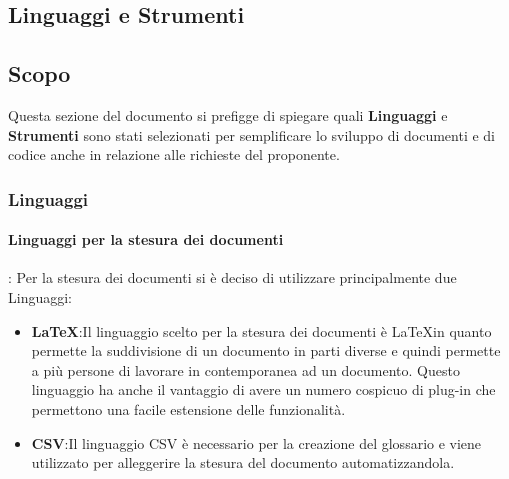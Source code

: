 \subsection{Linguaggi e Strumenti}
\subsection{Scopo}
Questa sezione del documento si prefigge di spiegare quali \textbf{Linguaggi} e
\textbf{Strumenti} sono stati selezionati per semplificare lo sviluppo di documenti
e di codice anche in relazione alle richieste del proponente.
\subsubsection{Linguaggi}
\paragraph{Linguaggi per la stesura dei documenti}:
Per la stesura dei documenti si è deciso di utilizzare principalmente due Linguaggi:
  \begin{itemize}
    \item \textbf{\LaTeX}:Il linguaggio scelto per la stesura dei documenti è \LaTeX \space in quanto permette
    la suddivisione di un documento in parti diverse e quindi permette a più persone
    di lavorare in contemporanea ad un documento.
    Questo linguaggio ha anche il vantaggio di avere un numero cospicuo di plug-in
    che permettono una facile estensione delle funzionalità.
    \item \textbf{CSV}:Il linguaggio CSV è necessario per la creazione del glossario e viene utilizzato
    per alleggerire la stesura del documento automatizzandola.
  \end{itemize}

